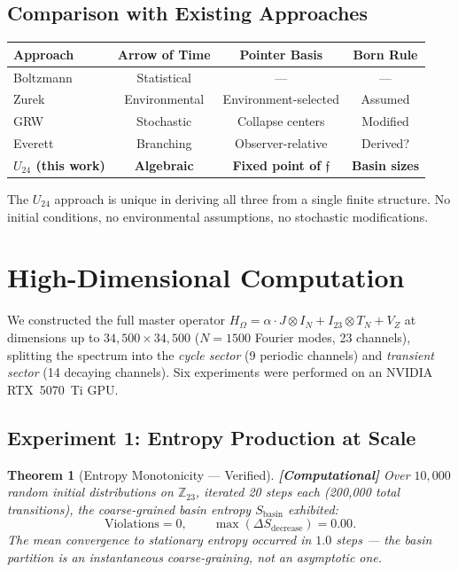\documentclass[12pt,a4paper]{article}
\newcommand{\computational}[1]{\textcolor{computational}{\textbf{[Computational]}} #1}
\newtheorem{theorem}{Theorem}[section]
\theoremstyle{definition}
\theoremstyle{remark}
\newcommand{\Reeds}{\mathfrak{f}}
\newcommand{\Zp}{\mathbb{Z}_{23}}
\newcommand{\Jcoup}{J}
\newcommand{\HOmega}{H_\Omega}
\begin{document}
\subsection{Comparison with Existing Approaches}

\begin{center}
\begin{tabular}{lccc}
\toprule
\textbf{Approach} & \textbf{Arrow of Time} & \textbf{Pointer Basis} & \textbf{Born Rule} \\
\midrule
Boltzmann \cite{boltzmann1872} & Statistical & --- & --- \\
Zurek \cite{zurek2003} & Environmental & Environment-selected & Assumed \\
GRW \cite{grw1986} & Stochastic & Collapse centers & Modified \\
Everett \cite{everett1957} & Branching & Observer-relative & Derived? \\
\textbf{$U_{24}$ (this work)} & \textbf{Algebraic} & \textbf{Fixed point of $\Reeds$} & \textbf{Basin sizes} \\
\bottomrule
\end{tabular}
\end{center}

The $U_{24}$ approach is unique in deriving all three from a single finite
structure. No initial conditions, no environmental assumptions, no stochastic
modifications.

\section{High-Dimensional Computation}
\label{sec:computation}

We constructed the full master operator $\HOmega = \alpha \cdot \Jcoup \otimes I_N + I_{23} \otimes T_N + V_Z$ at dimensions up to $34{,}500 \times 34{,}500$ ($N = 1500$ Fourier modes, 23 channels), splitting the spectrum into the \emph{cycle sector} (9 periodic channels) and \emph{transient sector} (14 decaying channels). Six experiments were performed on an NVIDIA RTX~5070~Ti GPU.

\subsection{Experiment 1: Entropy Production at Scale}

\begin{theorem}[Entropy Monotonicity --- Verified]
\label{thm:entropy_verified}
\computational{Over $10{,}000$ random initial distributions on $\Zp$, iterated 20 steps each (200{,}000 total transitions), the coarse-grained basin entropy $S_{\text{basin}}$ exhibited:}
\begin{equation}
  \text{Violations} = 0, \qquad \max(\Delta S_{\text{decrease}}) = 0.00.
\end{equation}
The mean convergence to stationary entropy occurred in $1.0$ steps --- the basin partition is an \emph{instantaneous} coarse-graining, not an asymptotic one.
\end{theorem}
\end{document}
